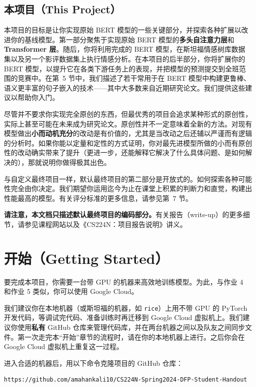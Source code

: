 \documentclass[11pt]{article}
\begin{document}
\subsection{本项目（This Project）}

本项目的目标是让你实现原始 BERT 模型的一些关键部分，并探索各种扩展以改进你的基线模型。第一部分聚焦于实现原始 BERT 模型的\textbf{多头自注意力层}和\textbf{Transformer 层}。随后，你将利用完成的 BERT 模型，在斯坦福情感树库数据集以及另一个影评数据集上执行情感分析。在本项目的后半部分，你将扩展你的 BERT 模型，以提升它在各类下游任务上的表现，并把模型的预测提交到全班范围的竞赛中。在第~5 节中，我们描述了若干常用于在 BERT 模型中构建更鲁棒、语义更丰富的句子嵌入的技术——其中大多数来自近期研究论文。我们提供这些建议以帮助你入门。

尽管并不要求你实现完全原创的东西，但最优秀的项目会追求某种形式的原创性，实际上甚至可能在未来成为研究论文。原创性并不一定意味着全新的方法。对现有模型做出\textbf{小而动机充分}的改动是有价值的，尤其是当改动之后还辅以严谨而有逻辑的分析时。如果你能以定量和定性的方式证明，你对最先进模型所做的小而有原创性的改动确实带来了提升（更进一步，还能解释它解决了什么具体问题、是如何解决的），那就说明你做得极其出色。

与自定义最终项目一样，默认最终项目的第二部分是开放式的。如何探索各种可能性完全由你决定。我们期望你运用迄今为止在课堂上积累的判断力和直觉，构建出性能最高的模型。有关评分标准的更多信息，请参见第~7 节。

\textbf{请注意，本文档只描述默认最终项目的编码部分。}有关报告（write-up）的更多细节，请参见课程网站以及《CS224N：项目报告说明》讲义。

\section{开始（Getting Started）}

要完成本项目，你需要一台带 GPU 的机器来高效地训练模型。为此，与作业 4 和作业 5 类似，你可以使用 Google Cloud。

我们建议你在本地机器（或斯坦福的机器，如 \texttt{rice}）上用不带 GPU 的 PyTorch 开发代码，等调试完代码、准备训练时再迁移到 Google Cloud 虚拟机上。我们建议你使用\textbf{私有} GitHub 仓库来管理代码库，并在两台机器之间以及队友之间同步文件。第一次走完本``开始''章节的流程时，请在你的本地机器上进行。之后你会在 Google Cloud 虚拟机上重复这一过程。

进入合适的机器后，用以下命令克隆项目的 GitHub 仓库：

\begin{lstlisting}[numbers=none]
https://github.com/amahankali10/CS224N-Spring2024-DFP-Student-Handout
\end{lstlisting}
\end{document}
